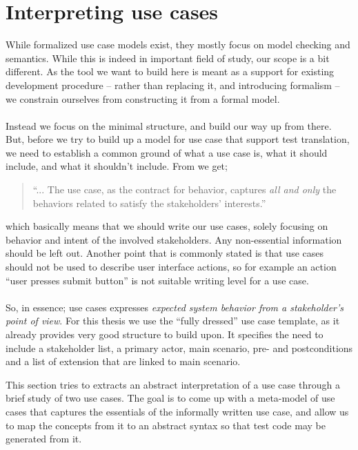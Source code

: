 \section{Interpreting use cases}
While formalized use case models exist\cite{klimek2010formal}, they mostly focus on model checking and semantics. While this is indeed in important field of study, our scope is a bit different. As the tool we want to build here is meant as a support for existing development procedure -- rather than replacing it, and introducing formalism -- we constrain ourselves from constructing it from a formal model.\\\\
Instead we focus on the minimal structure, and build our way up from there. But, before we try to build up a model for use case that support test translation, we need to establish a common ground of what a use case is, what it should include, and what it shouldn't include. From \cite{cockburn2000} we get;
\begin{quote}
``... The use case, as the contract for behavior, captures \emph{all and only} the behaviors related to satisfy the stakeholders’ interests.''
\end{quote}which basically means that we should write our use cases, solely focusing on behavior and intent of the involved stakeholders. Any non-essential information should be left out. Another point that is commonly stated is that use cases should not be used to describe user interface actions, so for example an action ``user presses submit button'' is not suitable writing level for a use case.\\\\
So, in essence; use cases expresses \emph{expected system behavior from a stakeholder's point of view}. For this thesis we use the ``fully dressed'' use case template\cite{larman2005}, as it already provides very good structure to build upon. It specifies the need to include a stakeholder list, a primary actor, main scenario, pre- and postconditions and a list of extension that are linked to main scenario.

This section tries to extracts an abstract interpretation of a use case through a brief study of two use cases. The goal is to come up with a meta-model of use cases that captures the essentials of the informally written use case, and allow us to map the concepts from it to an abstract syntax so that test code may be generated from it.

